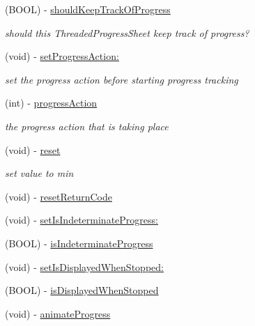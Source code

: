 \begin{DoxyCompactItemize}
(B\-O\-O\-L) -\/ \hyperlink{interface_m_b_threaded_progress_sheet_controller_a097a830d59f43b39aed288a282150482}{should\-Keep\-Track\-Of\-Progress}
\begin{DoxyCompactList}\small\item\em should this Threaded\-Progress\-Sheet keep track of progress? \end{DoxyCompactList}\item 
(void) -\/ \hyperlink{interface_m_b_threaded_progress_sheet_controller_a3447f1ebb68a1d53099c98027d1d217e}{set\-Progress\-Action\-:}
\begin{DoxyCompactList}\small\item\em set the progress action before starting progress tracking \end{DoxyCompactList}\item 
(int) -\/ \hyperlink{interface_m_b_threaded_progress_sheet_controller_a31fbac576cac2875944ad023b5627a39}{progress\-Action}
\begin{DoxyCompactList}\small\item\em the progress action that is taking place \end{DoxyCompactList}\item 
(void) -\/ \hyperlink{interface_m_b_threaded_progress_sheet_controller_ad20897c5c8bd47f5d4005989bead0e55}{reset}
\begin{DoxyCompactList}\small\item\em set value to min \end{DoxyCompactList}\item 
(void) -\/ \hyperlink{interface_m_b_threaded_progress_sheet_controller_ab684319c6c8fc4f80fe9ee09b999700c}{reset\-Return\-Code}
\item 
(void) -\/ \hyperlink{interface_m_b_threaded_progress_sheet_controller_a72f7c62d732a2ebaf586273d6e841b6a}{set\-Is\-Indeterminate\-Progress\-:}
\item 
(B\-O\-O\-L) -\/ \hyperlink{interface_m_b_threaded_progress_sheet_controller_a5d2a437c3aeec3d5a713ef4f52d9e366}{is\-Indeterminate\-Progress}
\item 
(void) -\/ \hyperlink{interface_m_b_threaded_progress_sheet_controller_ae29c745346808307df186dd782ac72de}{set\-Is\-Displayed\-When\-Stopped\-:}
\item 
(B\-O\-O\-L) -\/ \hyperlink{interface_m_b_threaded_progress_sheet_controller_a1eb38c41b58571667f15d727f606f3e0}{is\-Displayed\-When\-Stopped}
\item 
(void) -\/ \hyperlink{interface_m_b_threaded_progress_sheet_controller_a06dd04fe7e9d2adb18954ef4481e8be7}{animate\-Progress}

\end{DoxyCompactItemize}
